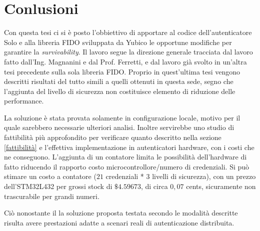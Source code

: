 \chapter{Conlusioni}
\label{conclusioni}

Con questa tesi ci si è posto l'obbiettivo di apportare al codice dell'autenticatore Solo e alla libreria FIDO sviluppata da Yubico le opportune modifiche per garantire la \emph{survivability}. Il lavoro segue la direzione generale tracciata dal lavoro fatto dall'Ing. Magnanini e dal Prof. Ferretti, e dal lavoro già svolto in un'altra tesi precedente sulla sola libreria FIDO. Proprio in quest'ultima tesi vengono descritti risultati del tutto simili a quelli ottenuti in questa sede, segno che l'aggiunta del livello di sicurezza non costituisce elemento di riduzione delle performance. 

La soluzione è stata provata solamente in configurazione locale, motivo per il quale sarebbero necessarie ulteriori analisi. Inoltre servirebbe uno studio di fattibilità più approfondito per verificare quanto descritto nella sezione \ref{fattibilità} e l'effettiva implementazione in autenticatori hardware, con i costi che ne conseguono. L'aggiunta di un contatore limita le possibilità dell'hardware di fatto riducendo il rapporto costo microcontrollore/numero di credenziali. Si può stimare un costo a contatore ($21$ credenziali * $ 3$ livelli di sicurezza), con un prezzo dell'STM32L432 per grossi stock di $\$4.59673$, di circa $0,07$ cents, sicuramente non trascurabile per grandi numeri.

Ciò nonostante il la soluzione proposta testata secondo le modalità descritte risulta avere prestazioni adatte a scenari reali di autenticazione distribuita. 